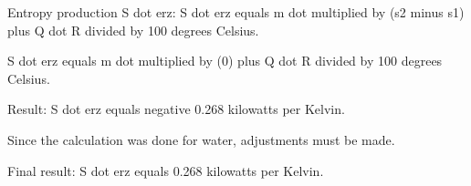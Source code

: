Entropy production S dot erz:  
S dot erz equals m dot multiplied by (s2 minus s1) plus Q dot R divided by 100 degrees Celsius.  

S dot erz equals m dot multiplied by (0) plus Q dot R divided by 100 degrees Celsius.  

Result:  
S dot erz equals negative 0.268 kilowatts per Kelvin.  

Since the calculation was done for water, adjustments must be made.  

Final result:  
S dot erz equals 0.268 kilowatts per Kelvin.